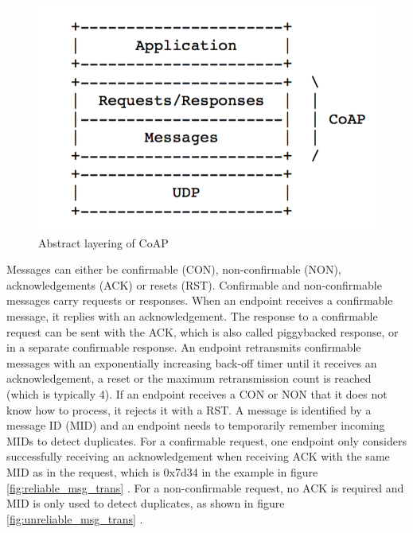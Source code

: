 \begin{figure}[!htbp]
\centering
\includegraphics[scale = 0.55]{coap_layer.png}
\caption{Abstract layering of CoAP}
\label{fig:coap_layer}
\end{figure}

Messages can either be confirmable (CON), non-confirmable (NON), acknowledgements (ACK) or resets (RST). Confirmable and non-confirmable messages carry requests or responses. When an endpoint receives a confirmable message, it replies with an acknowledgement. The response to a confirmable request can be sent with the ACK, which is also called piggybacked response, or in a separate confirmable response. An endpoint retransmits confirmable messages with an exponentially increasing back-off timer until it receives an acknowledgement, a reset or the maximum retransmission count is reached (which is typically 4). If an endpoint receives a CON or NON that it does not know how to process, it rejects it with a RST. A message is identified by a message ID (MID) and an endpoint needs to temporarily remember incoming MIDs to detect duplicates. For a confirmable request, one endpoint only considers successfully receiving an acknowledgement when receiving ACK with the same MID as in the request, which is 0x7d34 in the example in figure \ref{fig:reliable_msg_trans} \cite{coap_protocol}. For a non-confirmable request, no ACK is required and MID is only used to detect duplicates, as shown in figure \ref{fig:unreliable_msg_trans} \cite{coap_protocol}.

